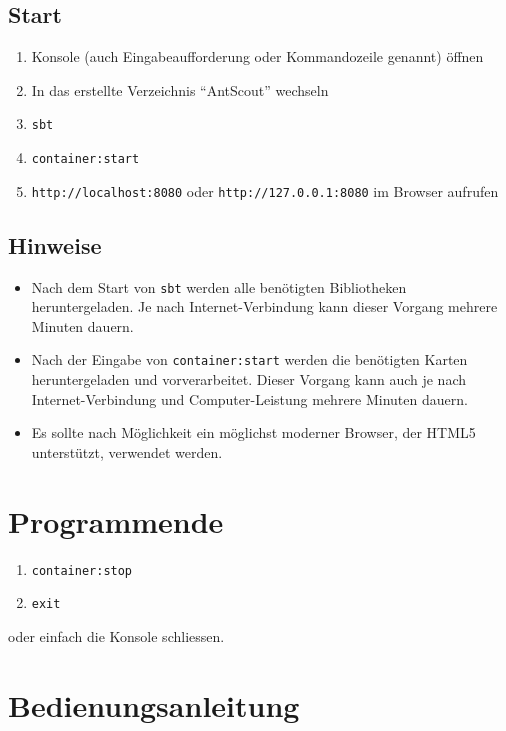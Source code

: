 \documentclass[a4paper,10pt]{scrreprt}
\begin{document}
\subsection{Start}
\label{sec:programmstart-start}

\begin{enumerate}
  \item Konsole (auch Eingabeaufforderung oder Kommandozeile genannt) öffnen
  \item In das erstellte Verzeichnis ``AntScout'' wechseln
  \item \texttt{sbt}
  \item \texttt{container:start}
  \item \texttt{http://localhost:8080} oder \texttt{http://127.0.0.1:8080} im Browser aufrufen
\end{enumerate}

\subsection{Hinweise}
\label{sec:programmstart-hinweise}

\begin{itemize}
  \item Nach dem Start von \texttt{sbt} werden alle benötigten Bibliotheken heruntergeladen.
    Je nach Internet-Verbindung kann dieser Vorgang mehrere Minuten dauern.
  \item Nach der Eingabe von \texttt{container:start} werden die benötigten Karten heruntergeladen und vorverarbeitet.
    Dieser Vorgang kann auch je nach Internet-Verbindung und Computer-Leistung mehrere Minuten dauern.
  \item Es sollte nach Möglichkeit ein möglichst moderner Browser, der HTML5 unterstützt, verwendet werden.
\end{itemize}

\section{Programmende}
\label{sec:programmende}

\begin{enumerate}
  \item \texttt{container:stop}
  \item \texttt{exit}
\end{enumerate}

oder einfach die Konsole schliessen.

\section{Bedienungsanleitung}
\label{sec:bedienungsanleitung}
\end{document}
